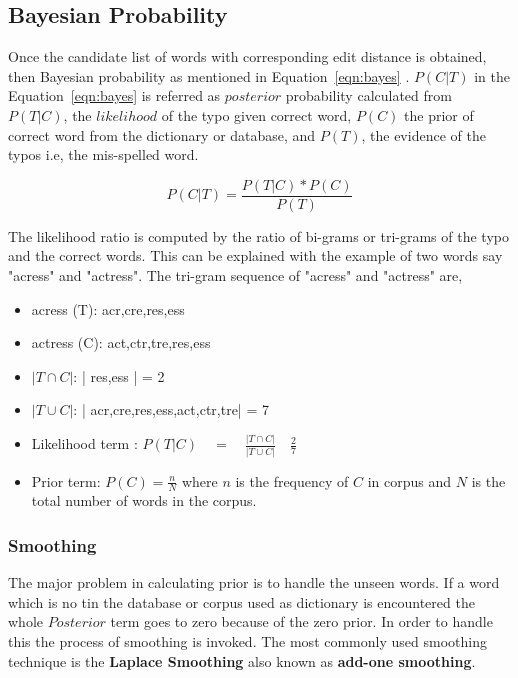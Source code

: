 \documentclass{bmcart}
\begin{document}
\subsection{Bayesian Probability}
\label{ssec:bayesProb}
Once the candidate list of words with corresponding edit distance is obtained, then Bayesian probability as mentioned in Equation~\ref{eqn:bayes} \cite{spellCheck}. $P(C|T)$ in the Equation~\ref{eqn:bayes} is referred as $posterior$ probability calculated from $P(T|C)$, the $likelihood$ of the typo given correct word, $P(C)$ the prior of correct word from the dictionary or database, and $P(T)$, the evidence of the typos i.e, the mis-spelled word.

\begin{center}
\begin{equation}
P(C|T)=\frac{P(T|C)*P(C)}{P(T)}
\label{eqn:bayes}
\end{equation}
\end{center}

The likelihood ratio is computed by the ratio of bi-grams or tri-grams of the typo and the correct words. This can be explained with the example of two words say "acress" and "actress". The tri-gram sequence of "acress" and "actress" are,
\begin{itemize}
\item acress (T): {acr,cre,res,ess}
\item actress (C): {act,ctr,tre,res,ess}
\item $|T \cap C|$: | res,ess | = 2
\item $|T \cup C|$: | acr,cre,res,ess,act,ctr,tre| = 7
\item Likelihood term :  $P(T|C) \quad = \quad \frac{|T \cap C|}{| T \cup C|} \quad \frac{2}{7}$ 
\item  Prior term: $P(C)=\frac{n}{N}$ where $n$ is the frequency of $C$ in corpus and $N$ is the total number of words in the corpus.
\end{itemize} 

\subsubsection{Smoothing}
\label{sssec:smooth}
The major problem in calculating prior is to handle the unseen words. If a word which is no tin the database or corpus used as dictionary is encountered the whole $Posterior$ term goes to zero because of the zero prior. In order to handle this the process of smoothing is invoked. The most commonly used smoothing technique is the \textbf{Laplace Smoothing} also known as \textbf{add-one smoothing}.
\end{document}
